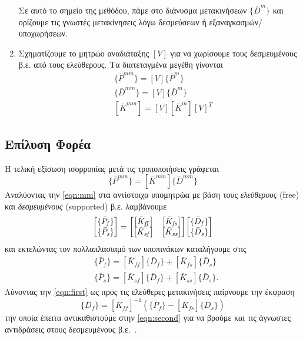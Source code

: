 \documentclass[a4paper, twocolumn]{article}
\newcommand{\vect}[1]{ \{ #1\} }
\newcommand{\mat}[1]{\left[ #1 \right]}
\newcommand{\Gstiff}[1]{\mat{\bar{K}^{\mathit{#1}}}}
\newcommand{\gforce}[1]{\vect{\bar{P}^{\mathit{#1}}}}
\newcommand{\gdisp}[1]{\vect{\bar{D}^{\mathit{#1}}}}
\newcommand{\subk}[1]{ \mat{\bar{K}_{\mathit{#1}}} }
\newcommand{\subp}[1]{\vect{\bar{P}_{\mathit{#1}}}}
\newcommand{\subd}[1]{\vect{\bar{D}_{\mathit{#1}}}}
\begin{document}
\begin{enumerate}
	Σε αυτό το σημείο της μεθόδου, πάμε στο διάνυσμα μετακινήσεων 
	$\gdisp{m}$ και 
	ορίζουμε τις γνωστές μετακίνησεις λόγω δεσμεύσεων ή 
	εξαναγκασμών/υποχωρήσεων. 
		
	\item Σχηματίζουμε το μητρώο αναδιάταξης $\mat{V}$ για να 
	χωρίσουμε τους δεσμευμένους β.ε. από τους ελεύθερους. Τα 
	διατεταγμένα μεγέθη γίνονται
	\begin{align}
		&\gforce{mm} = \mat{V} \gforce{m} \\
		&\gdisp{mm} = \mat{V} \gdisp{m} \\
		&\Gstiff{mm} = \mat{V} \Gstiff{m} \mat{V}^T
	\end{align}
\end{enumerate}

\subsection{Επίλυση Φορέα}
Η τελική εξίσωση ισορροπίας μετά τις τροποποιήσεις γράφεται
	\begin{equation}\label{eqn:mm}
		\gforce{mm} = \Gstiff{mm} \gdisp{mm}
	\end{equation}
Αναλύοντας την \ref{eqn:mm} στα αντίστοιχα υπομητρώα με βάση τους 
\emph{ελεύθερους} (free) και \emph{δεσμευμένους} (supported) β.ε. 
λαμβάνουμε
	\begin{equation}
		\mqty[ \subp{f} \\ \subp{s} ] = 
		\mqty[ \subk{ff} & \subk{fs} \\
		\subk{sf}& \subk{ss} ] 
		\mqty[ \subd{f} \\ \subd{s} ]
	\end{equation}
και εκτελώντας τον πολλαπλασιαμό των υποπινάκων καταλήγουμε στις
	\begin{align}
	 	&\subp{f} = \subk{ff} \subd{f} + \subk{fs} \subd{s} 
	 	\label{eqn:first} \\
		&\subp{s} = \subk{sf} \subd{f} + \subk{ss} \subd{s}. 
		\label{eqn:second}
	\end{align}
Λύνοντας την \ref{eqn:first} ως προς τις ελεύθερες 
μετακινήσεις παίρνουμε την έκφραση
	\begin{equation}
		\subd{f} 
		= \subk{ff}^{-1} ( \subp{f} - \subk{fs} \subd{s} ) 
		\label{eqn:dfree} 
	\end{equation}
την οποία έπειτα αντικαθιστούμε στην 
\ref{eqn:second} για να βρούμε και τις άγνωστες αντιδράσεις στους 
δεσμευμένους β.ε.~.
\end{document}
